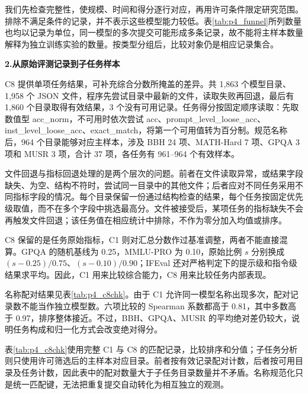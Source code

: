 我们先检查完整性，使规模、时间和得分逐行对应，再用许可条件限定研究范围。排除不满足条件的记录，并不表示这些模型能力较低。表\ref{tab:p4_funnel}所列数量也均以记录为单位，同一模型的多次提交可能形成多条记录，故不能将主样本数量解释为独立训练实验的数量。按类型分组后，比较对象仍是相应记录集合。

\textbf{2.从原始评测记录到子任务样本}\par\nopagebreak[4]
C8 提供单项任务结果，可补充综合分数所掩盖的差异。共 1,863 个模型目录、1,958 个 JSON 文件，程序先尝试目录中最新的文件，读取失败再回退，最后有 1,860 个目录取得有效结果，3 个没有可用记录。任务得分按固定顺序读取：先取数值型 acc\_norm，不可用时依次尝试 acc、prompt\_level\_loose\_acc、inst\_level\_loose\_acc、exact\_match，将第一个可用值转为百分制。规范名称后，964 个目录能够对应主样本，涉及 BBH 24 项、MATH-Hard 7 项、GPQA 3 项和 MUSR 3 项，合计 37 项，各任务有 961--964 个有效样本。

文件回退与指标回退处理的是两个层次的问题。前者在文件读取异常，或结果字段缺失、为空、结构不符时，尝试同一目录中的其他文件；后者应对不同任务采用不同指标字段的情况。每个目录保留一份通过结构检查的结果，每个任务按固定优先级取值，而不在多个字段中挑选最高分。文件被接受后，某项任务的指标缺失不会再触发文件回退；该任务值在相应统计中排除，不作为零分加入均值或排序。

C8 保留的是任务原始指标，C1 则对汇总分数作过基准调整，两者不能直接混算。GPQA 的随机基线为 0.25，MMLU-PRO 为 0.10，原始比例 $s$ 分别换成 $(s-0.25)/0.75$、$(s-0.10)/0.90$；IFEval 还对严格判定下的提示级和指令级结果求平均。因此，C1 用来比较综合能力，C8 用来比较任务内部表现。

名称配对结果见表\ref{tab:p4_c8chk}。由于 C1 允许同一模型名称出现多次，配对记录数不能当作独立模型数。六项比较的 Spearman 系数都高于 0.81，其中多数高于 0.97，排序整体接近。不过，BBH、GPQA、MUSR 的平均绝对差仍较大，说明任务构成和归一化方式会改变绝对得分。

表\ref{tab:p4_c8chk}使用完整 C1 与 C8 的匹配记录，比较排序和分值；子任务分析则只使用许可筛选后的主样本对应目录。前者按有效记录配对计数，后者按可用目录及任务计数，因此表中的配对数量大于子任务目录数量并不矛盾。名称规范化只是统一匹配键，无法把重复提交自动转化为相互独立的观测。

